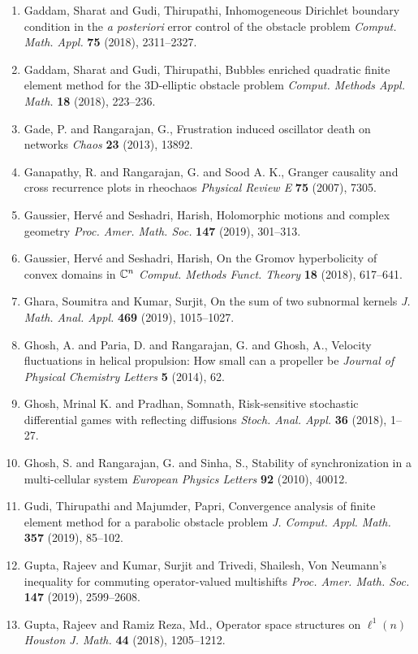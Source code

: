\begin{enumerate}
\item Gaddam, Sharat and Gudi, Thirupathi, Inhomogeneous {D}irichlet boundary condition in the {\it a
posteriori} error control of the obstacle problem {\em Comput. Math. Appl.} {\bf 75} (2018), 2311--2327.
\item Gaddam, Sharat and Gudi, Thirupathi, Bubbles enriched quadratic finite element method for the
3{D}-elliptic obstacle problem {\em Comput. Methods Appl. Math.} {\bf 18} (2018), 223--236.
\item Gade, P. and Rangarajan, G., Frustration induced oscillator death on networks {\em Chaos} {\bf 23} (2013), 13892.
\item Ganapathy, R. and Rangarajan, G. and Sood A. K., Granger causality and cross recurrence plots in rheochaos {\em Physical Review E} {\bf 75} (2007), 7305.
\item Gaussier, Herv\'{e} and Seshadri, Harish, Holomorphic motions and complex geometry {\em Proc. Amer. Math. Soc.} {\bf 147} (2019), 301--313.
\item Gaussier, Herv\'{e} and Seshadri, Harish, On the {G}romov hyperbolicity of convex domains in {$\Bbb
C^n$} {\em Comput. Methods Funct. Theory} {\bf 18} (2018), 617--641.
\item Ghara, Soumitra and Kumar, Surjit, On the sum of two subnormal kernels {\em J. Math. Anal. Appl.} {\bf 469} (2019), 1015--1027.
\item Ghosh, A. and Paria, D. and Rangarajan, G. and Ghosh, A., Velocity fluctuations in helical propulsion: How small can a propeller be {\em Journal of Physical Chemistry Letters} {\bf 5} (2014), 62.
\item Ghosh, Mrinal K. and Pradhan, Somnath, Risk-sensitive stochastic differential games with reflecting
diffusions {\em Stoch. Anal. Appl.} {\bf 36} (2018), 1--27.
\item Ghosh, S. and Rangarajan, G. and Sinha, S., Stability of synchronization in a multi-cellular system {\em European Physics Letters} {\bf 92} (2010), 40012.
\item Gudi, Thirupathi and Majumder, Papri, Convergence analysis of finite element method for a parabolic
obstacle problem {\em J. Comput. Appl. Math.} {\bf 357} (2019), 85--102.
\item Gupta, Rajeev and Kumar, Surjit and Trivedi, Shailesh, Von {N}eumann's inequality for commuting operator-valued
multishifts {\em Proc. Amer. Math. Soc.} {\bf 147} (2019), 2599--2608.
\item Gupta, Rajeev and Ramiz Reza, Md., Operator space structures on {$\ell^1(n)$} {\em Houston J. Math.} {\bf 44} (2018), 1205--1212.

\end{enumerate}
